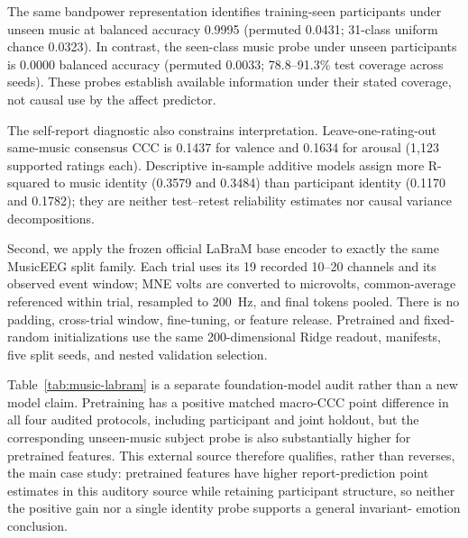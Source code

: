 The same bandpower representation identifies training-seen participants under
unseen music at balanced accuracy 0.9995 (permuted 0.0431; 31-class uniform
chance 0.0323). In contrast, the seen-class music probe under unseen
participants is 0.0000 balanced accuracy (permuted 0.0033; 78.8--91.3\% test
coverage across seeds). These probes establish available information under
their stated coverage, not causal use by the affect predictor.

The self-report diagnostic also constrains interpretation. Leave-one-rating-out
same-music consensus CCC is 0.1437 for valence and 0.1634 for arousal (1,123
supported ratings each). Descriptive in-sample additive models assign more
R-squared to music identity (0.3579 and 0.3484) than participant identity
(0.1170 and 0.1782); they are neither test--retest reliability estimates nor
causal variance decompositions.

Second, we apply the frozen official LaBraM base encoder to exactly the same
MusicEEG split family. Each trial uses its 19 recorded 10--20 channels and its
observed event window; MNE volts are converted to microvolts, common-average
referenced within trial, resampled to 200~Hz, and final tokens pooled. There is
no padding, cross-trial window, fine-tuning, or feature release. Pretrained and
fixed-random initializations use the same 200-dimensional Ridge readout,
manifests, five split seeds, and nested validation selection.

Table~\ref{tab:music-labram} is a separate foundation-model audit rather
than a new model claim. Pretraining has a positive matched macro-CCC point difference
in all four audited protocols, including participant and joint holdout, but the
corresponding unseen-music subject probe is also substantially higher for
pretrained features. This external source therefore qualifies, rather than
reverses, the main case study: pretrained features have higher report-prediction
point estimates in this auditory source while retaining participant structure, so neither
the positive gain nor a single identity probe supports a general invariant-
emotion conclusion.


